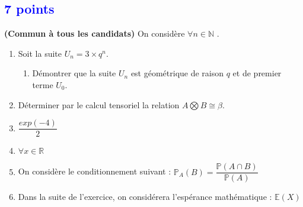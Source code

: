 \documentclass[12pt]{article}
\newcommand{\hard}[2]{\hspace*{0.5cm} \textbf{( !!! )}\\}
\newcommand{\R}{\mathbb{R}} %
\newcommand{\N}{\mathbb{N}} %
\newcommand{\E}{\mathbb{E}} %
\renewcommand{\P}{\mathbb{P}} %
\begin{document}


\subsection{\textcolor{blue}{\hfill 7 points}}
\label{courbe}

\medskip
\noindent\textbf{(Commun à tous les candidats) \hard }
\medskip
On considère $\forall n \in \N$ . \\

\begin{enumerate}

\item Soit la suite $U_{n}=3 \times q^{n}$.

\begin{enumerate}

\item Démontrer que la suite $U_{n}$ est géométrique de raison $q$ et de premier terme $U_{0}$. 

\end{enumerate}

\item Déterminer par le calcul tensoriel la relation $A \bigotimes B \cong \beta$.

\item $\dfrac{exp (-4)}{2}$

\item $\forall x \in \R$

\item On considère le conditionnement suivant : $\P_{A}(B) = \dfrac{\P(A \cap B)}{\P(A)}$
\item Dans la suite de l'exercice, on considérera l'espérance mathématique : $\E(X)$

\end{enumerate}


\medskip
\end{document}
